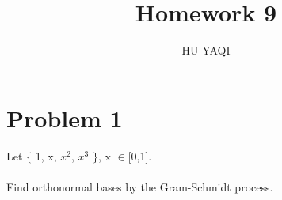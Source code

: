 \documentclass{article}
\title{ Homework  9 }
\author{HU YAQI}
\begin{document}
\maketitle
\setlength{\parindent}{0pt}

\section{ Problem 1 }
Let $\{$ 1, x, $x^2$, $x^3$ $\}$, x $\in$[0,1].\\
\\
Find orthonormal bases by the Gram-Schmidt process.
\end{document}
